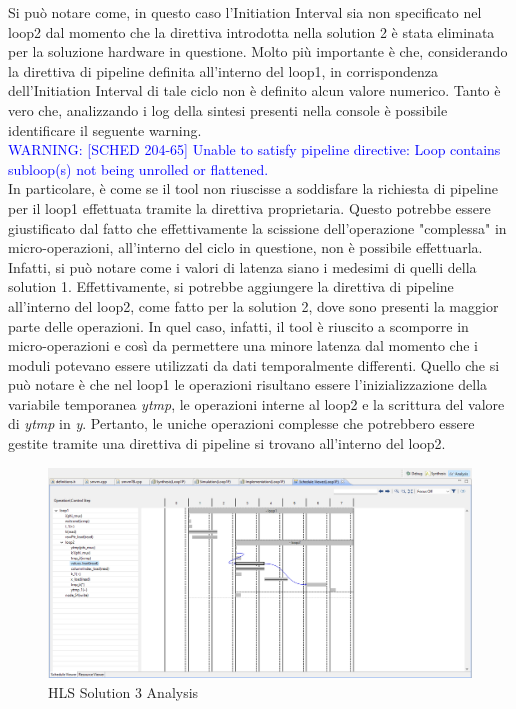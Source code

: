 Si può notare come, in questo caso l'Initiation Interval sia non specificato nel loop2 dal momento che la direttiva introdotta nella solution 2 è stata eliminata per la soluzione hardware in questione. Molto più importante è che, considerando la direttiva di pipeline definita all'interno del loop1, in corrispondenza dell'Initiation Interval di tale ciclo non è definito alcun valore numerico. Tanto è vero che, analizzando i log della sintesi presenti nella console è possibile identificare il seguente warning.
\\
\textcolor{blue}{WARNING: [SCHED 204-65] Unable to satisfy pipeline directive: Loop contains subloop(s) not being unrolled or flattened.}
\\
In particolare, è come se il tool non riuscisse a soddisfare la richiesta di pipeline per il loop1 effettuata tramite la direttiva proprietaria. Questo potrebbe essere giustificato dal fatto che effettivamente la scissione dell'operazione "complessa" in micro-operazioni, all'interno del ciclo in questione, non è possibile effettuarla. Infatti, si può notare come i valori di latenza siano i medesimi di quelli della solution 1. Effettivamente, si potrebbe aggiungere la direttiva di pipeline all'interno del loop2, come fatto per la solution 2, dove sono presenti la maggior parte delle operazioni. In quel caso, infatti, il tool è riuscito a scomporre in micro-operazioni e così da permettere una minore latenza dal momento che i moduli potevano essere utilizzati da dati temporalmente differenti. Quello che si può notare è che nel loop1 le operazioni risultano essere l'inizializzazione della variabile temporanea \textit{ytmp}, le operazioni interne al loop2 e la scrittura del valore di \textit{ytmp} in \textit{y}. Pertanto, le uniche operazioni complesse che potrebbero essere gestite tramite una direttiva di pipeline si trovano all'interno del loop2.

\begin{figure}[H]
	\centering
	\includegraphics[width=1\textwidth]{solutions/s3/loop1pipeline.png}
	\caption{HLS Solution 3 Analysis}
\end{figure}

